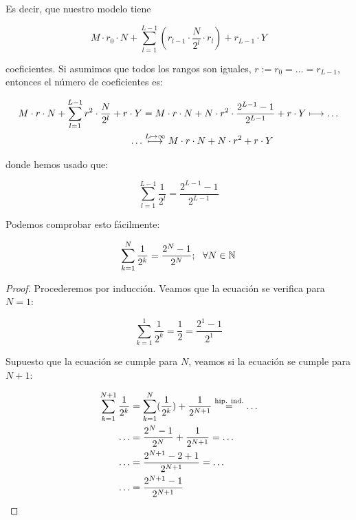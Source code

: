 Es decir, que nuestro modelo tiene

\begin{equation}
    M \cdot r_0 \cdot N + \sum_{l = 1}^{L-1} (r_{l-1} \cdot \frac{N}{2^l} \cdot r_l ) +
    r_{L-1} \cdot Y
\end{equation}

coeficientes. Si asumimos que todos los rangos son iguales, $r := r_0 = \ldots = r_{L-1}$, entonces el número de coeficientes es:

\begin{equation}
\begin{split}
    M \cdot r \cdot N + \sum_{l = 1}^{L-1} r^2 \cdot \frac{N}{2^l} + r \cdot Y &= M \cdot r \cdot N + N \cdot r^2 \cdot \frac{2^{L-1} - 1}{2^{L-1}} + r \cdot Y \longmapsto \ldots \\
    \ldots & \encima{\longmapsto}{L \mapsto \infty} M \cdot r \cdot N + N \cdot r^2 + r \cdot Y
\end{split}
\end{equation}

donde hemos usado que:

\begin{equation}
    \sum_{l = 1}^{L-1} \frac{1}{2^l} = \frac{2^{L-1} - 1}{2^{L-1}}
\end{equation}

Podemos comprobar esto fácilmente:

\begin{proposicion}
    \begin{equation}
        \sum_{k = 1}^{N} \frac{1}{2^k} = \frac{2^N - 1}{2^N}; \dspace \forall N \in \N
    \end{equation}
\end{proposicion}

\begin{proof}
    Procederemos por inducción. Veamos que la ecuación se verifica para $N = 1$:

    \begin{equation}
        \sum_{k = 1}^{1} \frac{1}{2^k} = \frac{1}{2} = \frac{2^1 - 1}{2^1}
    \end{equation}

    Supuesto que la ecuación se cumple para $N$, veamos si la ecuación se cumple para $N + 1$:

    \begin{equation}
    \begin{split}
        \sum_{k = 1}^{N+1} \frac{1}{2^k} &= \sum_{k = 1}^{N} (\frac{1}{2^k}) + \frac{1}{2^{N+1}} \encima{=}{\text{hip. ind.}} \ldots \\
        \ldots &= \frac{2^N - 1}{2^N} + \frac{1}{2^{N+1}} = \ldots \\
        \ldots &= \frac{2^{N+1} - 2 + 1}{2^{N+1}} = \ldots \\
        \ldots &= \frac{2^{N+1} - 1}{2^{N+1}}
    \end{split}
    \end{equation}
\end{proof}

